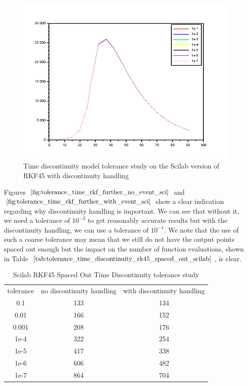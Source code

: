 \begin{figure}[H]
\centering
\includegraphics[width=0.7\linewidth]{./figures/tolerance_time_rkf_further_with_event_sci}
\caption{Time discontinuity model tolerance study on the Scilab version of RKF45 with discontinuity handling}
\label{fig:tolerance_time_rkf_further_with_event_sci}
\end{figure}

Figures $\ref{fig:tolerance_time_rkf_further_no_event_sci}$ and $\ref{fig:tolerance_time_rkf_further_with_event_sci}$ show a clear indication regarding why discontinuity handling is important. We can see that without it, we need a tolerance of $10^{-3}$ to get reasonably accurate results but with the discontinuity handling, we can use a tolerance of $10^{-1}$. We note that the use of such a coarse tolerance may mean that we still do not have the output points spaced out enough but the impact on the number of function evaluations, shown in Table $\ref{tab:tolerance_time_discontinuity_rk45_spaced_out_scilab}$, is clear.

\begin{table}[H]
\caption {Scilab RKF45 Spaced Out Time Discontinuity tolerance study} 
\label{tab:tolerance_time_discontinuity_rk45_spaced_out_scilab} 
\begin{center}
\begin{tabular}{ c c c }
tolerance & no discontinuity handling & with discontinuity handling\\ 
0.1 & 133 & 134 \\
0.01 & 166 & 152 \\
0.001 & 208 & 176 \\
1e-4 & 322 & 254 \\
1e-5 & 417 & 338 \\
1e-6 & 606 & 482 \\
1e-7 & 864 & 704 \\
\end{tabular}
\end{center}
\end{table}

